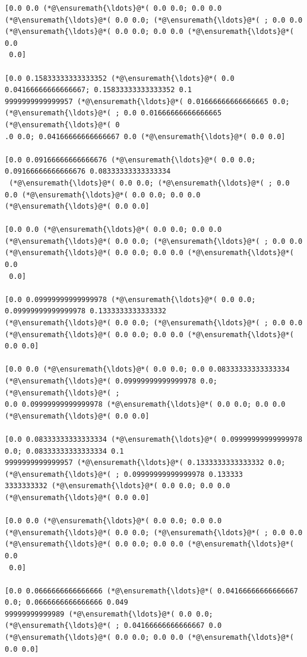 \documentclass[12pt,a4paper]{article}
\begin{document}
\begin{lstlisting}
[0.0 0.0 (*@\ensuremath{\ldots}@*( 0.0 0.0; 0.0 0.0 (*@\ensuremath{\ldots}@*( 0.0 0.0; (*@\ensuremath{\ldots}@*( ; 0.0 0.0 (*@\ensuremath{\ldots}@*( 0.0 0.0; 0.0 0.0 (*@\ensuremath{\ldots}@*( 0.0
 0.0]

[0.0 0.15833333333333352 (*@\ensuremath{\ldots}@*( 0.0 0.04166666666666667; 0.15833333333333352 0.1
9999999999999957 (*@\ensuremath{\ldots}@*( 0.01666666666666665 0.0; (*@\ensuremath{\ldots}@*( ; 0.0 0.01666666666666665 (*@\ensuremath{\ldots}@*( 0
.0 0.0; 0.04166666666666667 0.0 (*@\ensuremath{\ldots}@*( 0.0 0.0]

[0.0 0.09166666666666676 (*@\ensuremath{\ldots}@*( 0.0 0.0; 0.09166666666666676 0.08333333333333334
 (*@\ensuremath{\ldots}@*( 0.0 0.0; (*@\ensuremath{\ldots}@*( ; 0.0 0.0 (*@\ensuremath{\ldots}@*( 0.0 0.0; 0.0 0.0 (*@\ensuremath{\ldots}@*( 0.0 0.0]

[0.0 0.0 (*@\ensuremath{\ldots}@*( 0.0 0.0; 0.0 0.0 (*@\ensuremath{\ldots}@*( 0.0 0.0; (*@\ensuremath{\ldots}@*( ; 0.0 0.0 (*@\ensuremath{\ldots}@*( 0.0 0.0; 0.0 0.0 (*@\ensuremath{\ldots}@*( 0.0
 0.0]

[0.0 0.09999999999999978 (*@\ensuremath{\ldots}@*( 0.0 0.0; 0.09999999999999978 0.1333333333333332 
(*@\ensuremath{\ldots}@*( 0.0 0.0; (*@\ensuremath{\ldots}@*( ; 0.0 0.0 (*@\ensuremath{\ldots}@*( 0.0 0.0; 0.0 0.0 (*@\ensuremath{\ldots}@*( 0.0 0.0]

[0.0 0.0 (*@\ensuremath{\ldots}@*( 0.0 0.0; 0.0 0.08333333333333334 (*@\ensuremath{\ldots}@*( 0.09999999999999978 0.0; (*@\ensuremath{\ldots}@*( ; 
0.0 0.09999999999999978 (*@\ensuremath{\ldots}@*( 0.0 0.0; 0.0 0.0 (*@\ensuremath{\ldots}@*( 0.0 0.0]

[0.0 0.08333333333333334 (*@\ensuremath{\ldots}@*( 0.09999999999999978 0.0; 0.08333333333333334 0.1
9999999999999957 (*@\ensuremath{\ldots}@*( 0.1333333333333332 0.0; (*@\ensuremath{\ldots}@*( ; 0.09999999999999978 0.133333
3333333332 (*@\ensuremath{\ldots}@*( 0.0 0.0; 0.0 0.0 (*@\ensuremath{\ldots}@*( 0.0 0.0]

[0.0 0.0 (*@\ensuremath{\ldots}@*( 0.0 0.0; 0.0 0.0 (*@\ensuremath{\ldots}@*( 0.0 0.0; (*@\ensuremath{\ldots}@*( ; 0.0 0.0 (*@\ensuremath{\ldots}@*( 0.0 0.0; 0.0 0.0 (*@\ensuremath{\ldots}@*( 0.0
 0.0]

[0.0 0.0666666666666666 (*@\ensuremath{\ldots}@*( 0.04166666666666667 0.0; 0.0666666666666666 0.049
99999999999989 (*@\ensuremath{\ldots}@*( 0.0 0.0; (*@\ensuremath{\ldots}@*( ; 0.04166666666666667 0.0 (*@\ensuremath{\ldots}@*( 0.0 0.0; 0.0 0.0 (*@\ensuremath{\ldots}@*( 
0.0 0.0]


\end{lstlisting}
\end{document}
